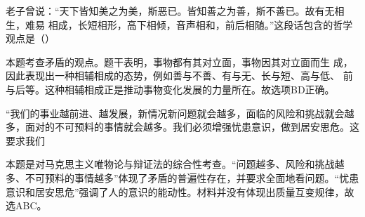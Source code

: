 \question 老子曾说：``天下皆知美之为美，斯恶已。皆知善之为善，斯不善已。故有无相生，难易
相成，长短相形，高下相倾，音声相和，前后相随。''这段话包含的哲学观点是（）
\par{}
\begin{solution}本题考查矛盾的观点。题干表明，事物都有其对立面，事物因其对立面而生
成，因此表现出一种相辅相成的态势，例如善与不善、有与无、长与短、高与低、
前与后等。这种相辅相成正是推动事物变化发展的力量所在。故选项BD正确。
\end{solution}
\question ``我们的事业越前进、越发展，新情况新问题就会越多，面临的风险和挑战就会越多，面对的不可预料的事情就会越多。我们必须增强忧患意识，做到居安思危。这要求我们
\par{}
\begin{solution}本题是对马克思主义唯物论与辩证法的综合性考查。``问题越多、风险和挑战越多、不可预料的事情越多''体现了矛盾的普遍性存在，并要求全面地看问题。``忧患意识和居安思危''强调了人的意识的能动性。材料并没有体现出质量互变规律，故选ABC。
\end{solution}
